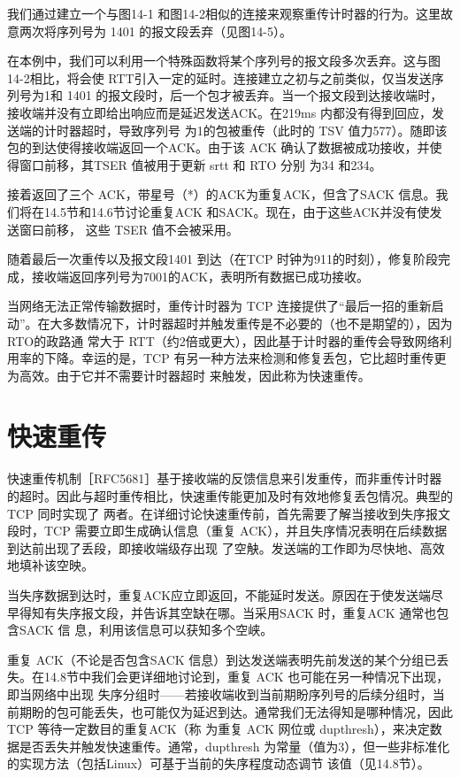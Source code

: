 我们通过建立一个与图14-1 和图14-2相似的连接来观察重传计时器的行为。这里故意两次将序列号为 1401 的报文段丢弃（见图14-5）。

在本例中，我们可以利用一个特殊函数将某个序列号的报文段多次丢弃。这与图14-2相比，将会使 RTT引入一定的延时。连接建立之初与之前类似，仅当发送序列号为1和
1401 的报文段时，后一个包才被丢弃。当一个报文段到达接收端时，接收端并没有立即给出响应而是延迟发送ACK。在219ms 内都没有得到回应，发送端的计时器超时，导致序列号
为1的包被重传（此时的 TSV 值力577）。随即该包的到达使得接收端返回一个ACK。由于该 ACK 确认了数据被成功接收，并使得窗口前移，其TSER 值被用于更新 srtt 和 RTO 分别
为34 和234。

接着返回了三个 ACK，带星号（*）的ACK为重复ACK，但含了SACK 信息。我们将在14.5节和14.6节讨论重复ACK 和SACK。现在，由于这些ACK并没有使发送窗曰前移，
这些 TSER 值不会被采用。

随着最后一次重传以及报文段1401 到达（在TCP 时钟为911的时刻），修复阶段完成，接收端返回序列号为7001的ACK，表明所有数据已成功接收。

当网络无法正常传输数据时，重传计时器为 TCP 连接提供了“最后一招的重新启动”。在大多数情况下，计时器超时并触发重传是不必要的（也不是期望的），因为RTO的政路通
常大于 RTT（约2倍或更大），因此基于计时器的重传会导致网络利用率的下降。幸运的是，TCP 有另一种方法来检测和修复丢包，它比超时重传更为高效。由于它并不需要计时器超时
来触发，因此称为快速重传。

\section{快速重传}
快速重传机制［RFC5681］基于接收端的反馈信息来引发重传，而非重传计时器的超时。因此与超时重传相比，快速重传能更加及时有效地修复丢包情况。典型的TCP 同时实现了
两者。在详细讨论快速重传前，首先需要了解当接收到失序报文段时，TCP 需要立即生成确认信息（重复 ACK），并且失序情况表明在后续数据到达前出现了丢段，即接收端级存出现
了空觖。发送端的工作即为尽快地、高效地填补该空映。

当失序数据到达时，重复ACK应立即返回，不能延时发送。原因在于使发送端尽早得知有失序报文段，并告诉其空缺在哪。当采用SACK 时，重复ACK 通常也包含SACK 信
息，利用该信息可以获知多个空峡。

重复 ACK（不论是否包含SACK 信息）到达发送端表明先前发送的某个分组已丢失。在14.8节中我们会更详细地讨论到，重复 ACK 也可能在另一种情况下出现，即当网络中出现
失序分组时——若接收端收到当前期盼序列号的后续分组时，当前期盼的包可能丢失，也可能仅为延迟到达。通常我们无法得知是哪种情况，因此TCP 等待一定数目的重复ACK（称
为重复 ACK 网位或 dupthresh），来决定数据是否丢失并触发快速重传。通常，dupthresh 为常量（值为3），但一些非标准化的实现方法（包括Linux）可基于当前的失序程度动态调节
该值（见14.8节）。

